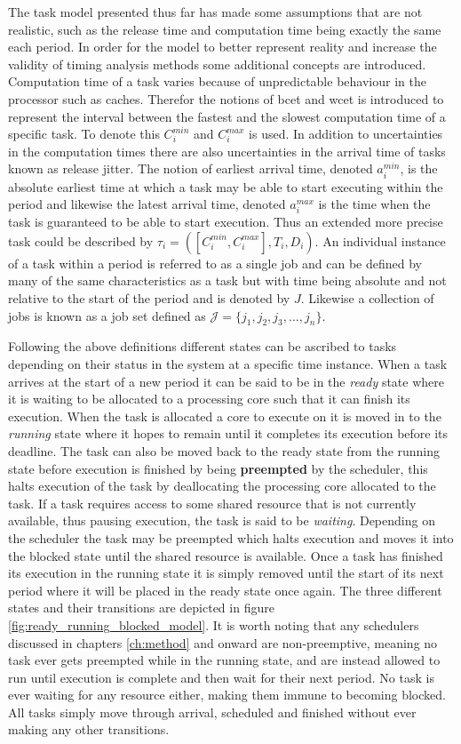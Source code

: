 \documentclass{kththesis}
\begin{document}
The task model presented thus far has made some assumptions that are not realistic, such as the
release time and computation time being exactly the same each period. In order for the model to
better represent reality and increase the validity of timing analysis methods some additional
concepts are introduced. Computation time of a task varies because of unpredictable behaviour in the
processor such as caches. Therefor the notions of \acrfull{bcet} and \acrfull{wcet} is introduced to
represent the interval between the fastest and the slowest computation time of a specific task. To
denote this $ C_i^{min} $ and $ C_i^{max} $ is used. In addition to uncertainties in the computation
times there are also uncertainties in the arrival time of tasks known as release jitter. The notion
of earliest arrival time, denoted $ a_i^{min} $, is the  absolute earliest time at which a task may
be able to start executing within the period and likewise the latest arrival time, denoted $
a_i^{max} $ is the time when the task is guaranteed to be able to start execution. Thus an extended
more precise task could be described by $ \tau_i = ( [C_i^{min}, C_i^{max}], T_i, D_i) $. An
individual instance of a task within a period is referred to as a single job and can be defined by
many of the same characteristics as a task but with time being absolute and not relative to the
start of the period and is denoted by $J$. Likewise a collection of jobs is known as a job set
defined as $ \mathcal{J} = \{j_1, j_2, j_3, ..., j_n\} $.

Following the above definitions different states can be ascribed to tasks depending on their
status in the system at a specific time instance. When a task arrives at the start of a new period
it can be said to be in the \textit{ready} state where it is waiting to be allocated to a processing
core such that it can finish its execution. When the task is allocated a core to execute on it is
moved in to the \textit{running} state where it hopes to remain until it completes its execution
before its deadline. The task can also be moved back to the ready state from the running state
before execution is finished by being \textbf{preempted} by the scheduler, this halts execution of
the task by deallocating the processing core allocated to the task. If a task requires access to
some shared resource that is not currently available, thus pausing execution, the task is said to be
\textit{waiting}. Depending on the scheduler the task may be preempted which halts execution and
moves it into the blocked state until the shared resource is available. Once a task has
finished its execution in the running state it is simply removed until the start of its next period
where it will be placed in the ready state once again. The three different states
and their transitions are depicted in figure \ref{fig:ready_running_blocked_model}. It is worth
noting that any schedulers discussed in chapters \ref{ch:method} and onward are non-preemptive,
meaning no task ever gets preempted while in the running state, and are instead allowed to run until
execution is complete and then wait for their next period. No task is ever waiting for any resource
either, making them immune to becoming blocked. All tasks simply move through arrival, scheduled and
finished without ever making any other transitions. 
\end{document}
